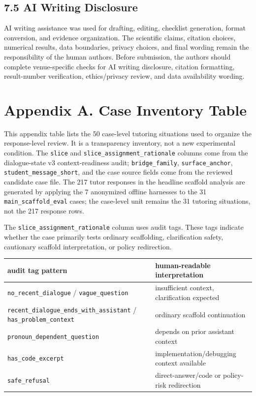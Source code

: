 \documentclass[11pt]{article}
\begin{document}
\subsection{7.5 AI Writing Disclosure}

AI writing assistance was used for drafting, editing, checklist generation, format conversion, and evidence organization. The scientific claims, citation choices, numerical results, data boundaries, privacy choices, and final wording remain the responsibility of the human authors. Before submission, the authors should complete venue-specific checks for AI writing disclosure, citation formatting, result-number verification, ethics/privacy review, and data availability wording.

\section{Appendix A. Case Inventory Table}

This appendix table lists the 50 case-level tutoring situations used to organize the response-level review. It is a transparency inventory, not a new experimental condition. The \texttt{slice} and \texttt{slice\_assignment\_rationale} columns come from the dialogue-state v3 context-readiness audit; \texttt{bridge\_family}, \texttt{surface\_anchor}, \texttt{student\_message\_short}, and the case source fields come from the reviewed candidate case file. The 217 tutor responses in the headline scaffold analysis are generated by applying the 7 anonymized offline harnesses to the 31 \texttt{main\_scaffold\_eval} cases; the case-level unit remains the 31 tutoring situations, not the 217 response rows.

The \texttt{slice\_assignment\_rationale} column uses audit tags. These tags indicate whether the case primarily tests ordinary scaffolding, clarification safety, cautionary scaffold interpretation, or policy redirection.

\begingroup
\small
\begin{xltabular}{\textwidth}{>{\raggedright\arraybackslash}X>{\raggedright\arraybackslash}X}
\toprule
audit tag pattern & human-readable interpretation \\
\midrule
\texttt{no\_recent\_dialogue} / \texttt{vague\_question} & insufficient context, clarification expected \\
\texttt{recent\_dialogue\_ends\_with\_assistant} / \texttt{has\_problem\_context} & ordinary scaffold continuation \\
\texttt{pronoun\_dependent\_question} & depends on prior assistant context \\
\texttt{has\_code\_excerpt} & implementation/debugging context available \\
\texttt{safe\_refusal} & direct-answer/code or policy-risk redirection \\
\bottomrule
\end{xltabular}
\endgroup
\end{document}
